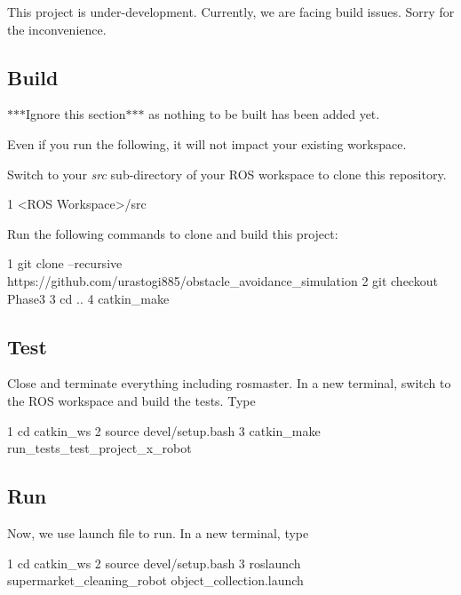 This project is under-\/development. Currently, we are facing build issues. Sorry for the inconvenience.

\subsection*{Build}


\begin{DoxyItemize}
\item $\ast$$\ast$$\ast$\+Ignore this section$\ast$$\ast$$\ast$ as nothing to be built has been added yet.
\item Even if you run the following, it will not impact your existing workspace.
\item Switch to your {\itshape src} sub-\/directory of your R\+OS workspace to clone this repository. 
\begin{DoxyCode}
1 <ROS Workspace>/src
\end{DoxyCode}

\item Run the following commands to clone and build this project\+: 
\begin{DoxyCode}
1 git clone --recursive https://github.com/urastogi885/obstacle\_avoidance\_simulation
2 git checkout Phase3
3 cd ..
4 catkin\_make
\end{DoxyCode}

\end{DoxyItemize}

\subsection*{Test}

Close and terminate everything including rosmaster. In a new terminal, switch to the R\+OS workspace and build the tests. Type


\begin{DoxyCode}
1 cd catkin\_ws
2 source devel/setup.bash
3 catkin\_make run\_tests\_test\_project\_x\_robot
\end{DoxyCode}


\subsection*{Run}

Now, we use launch file to run. In a new terminal, type


\begin{DoxyCode}
1 cd catkin\_ws
2 source devel/setup.bash
3 roslaunch supermarket\_cleaning\_robot object\_collection.launch
\end{DoxyCode}


